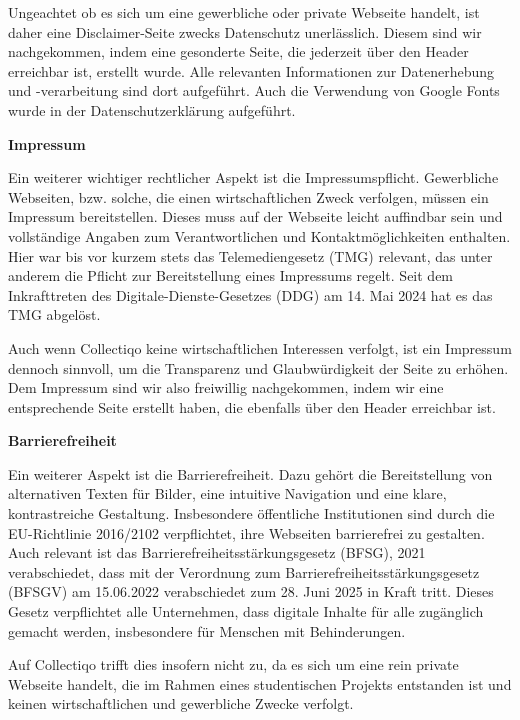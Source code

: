 Ungeachtet ob es sich um eine gewerbliche oder private Webseite handelt, ist daher eine Disclaimer-Seite zwecks Datenschutz unerlässlich.
Diesem sind wir nachgekommen, indem eine gesonderte Seite, die jederzeit über den Header erreichbar ist, erstellt wurde.
Alle relevanten Informationen zur Datenerhebung und -verarbeitung sind dort aufgeführt.
Auch die Verwendung von Google Fonts wurde in der Datenschutzerklärung aufgeführt.

\textbf{Impressum}\par
Ein weiterer wichtiger rechtlicher Aspekt ist die Impressumspflicht.
Gewerbliche Webseiten, bzw. solche, die einen wirtschaftlichen Zweck verfolgen, müssen ein Impressum bereitstellen.
Dieses muss auf der Webseite leicht auffindbar sein und vollständige Angaben zum Verantwortlichen und Kontaktmöglichkeiten enthalten.
Hier war bis vor kurzem stets das Telemediengesetz (TMG) relevant, das unter anderem die Pflicht zur Bereitstellung eines Impressums regelt.
Seit dem Inkrafttreten des Digitale-Dienste-Gesetzes (DDG) am 14. Mai 2024 hat es das TMG abgelöst.

Auch wenn Collectiqo keine wirtschaftlichen Interessen verfolgt, ist ein Impressum dennoch sinnvoll, um die Transparenz und Glaubwürdigkeit der Seite zu erhöhen.
Dem Impressum sind wir also freiwillig nachgekommen, indem wir eine entsprechende Seite erstellt haben, die ebenfalls über den Header erreichbar ist.

\textbf{Barrierefreiheit}\par
Ein weiterer Aspekt ist die Barrierefreiheit.
Dazu gehört die Bereitstellung von alternativen Texten für Bilder, eine intuitive Navigation und eine klare, kontrastreiche Gestaltung.
Insbesondere öffentliche Institutionen sind durch die EU-Richtlinie 2016/2102 verpflichtet, ihre Webseiten barrierefrei zu gestalten.
Auch relevant ist das Barrierefreiheitsstärkungsgesetz (BFSG), 2021 verabschiedet, dass mit der Verordnung zum Barrierefreiheitsstärkungsgesetz (BFSGV) am 15.06.2022 verabschiedet zum 28. Juni 2025 in Kraft tritt.
Dieses Gesetz verpflichtet alle Unternehmen, dass digitale Inhalte für alle zugänglich gemacht werden, insbesondere für Menschen mit Behinderungen.

Auf Collectiqo trifft dies insofern nicht zu, da es sich um eine rein private Webseite handelt, die im Rahmen eines studentischen Projekts entstanden ist und keinen wirtschaftlichen und gewerbliche Zwecke verfolgt.


